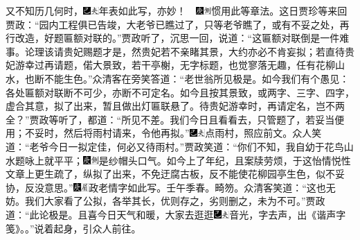 又不知历几何时，{\includegraphics[width=3mm]{../Images/00003}\includegraphics[width=3mm]{../Images/00012}\footnotesize \kaishu 年表如此写，亦妙！　{\includegraphics[width=3mm]{../Images/00004}\includegraphics[width=3mm]{../Images/00011}\footnotesize \kaishu 惯用此等章法。}}这日贾珍等来回贾政：``园内工程俱已告竣，大老爷已瞧过了，只等老爷瞧了，或有不妥之处，再行改造，好题匾额对联的。''贾政听了，沉思一回，说道：``这匾额对联倒是一件难事。论理该请贵妃赐题才是，然贵妃若不亲睹其景，大约亦必不肯妄拟；若直待贵妃游幸过再请题，偌大景致，若干亭榭，无字标题，也觉寥落无趣，任有花柳山水，也断不能生色。''众清客在旁笑答道：``老世翁所见极是。如今我们有个愚见：各处匾额对联断不可少，亦断不可定名。如今且按其景致，或两字、三字、四字，虚合其意，拟了出来，暂且做出灯匾联悬了。待贵妃游幸时，再请定名，岂不两全？''贾政等听了，都道：``所见不差。我们今日且看看去，只管题了，若妥当便用；不妥时，然后将雨村请来，令他再拟。''{\includegraphics[width=3mm]{../Images/00003}\includegraphics[width=3mm]{../Images/00012}\footnotesize \kaishu 点雨村，照应前文。}众人笑道：``老爷今日一拟定佳，何必又待雨村。''贾政笑道：``你们不知，我自幼于花鸟山水题咏上就平平；{\includegraphics[width=3mm]{../Images/00004}\includegraphics[width=3mm]{../Images/00011}\footnotesize \kaishu 是纱帽头口气。}如今上了年纪，且案牍劳烦，于这怡情悦性文章上更生疏了，纵拟了出来，不免迂腐古板，反不能使花柳园亭生色，似不妥协，反没意思。''{\includegraphics[width=3mm]{../Images/00004}\includegraphics[width=3mm]{../Images/00010}\footnotesize \kaishu 政老情字如此写。壬午季春。畸笏。}众清客笑道：``这也无妨。我们大家看了公拟，各举其长，优则存之，劣则删之，未为不可。''贾政道：``此论极是。且喜今日天气和暖，大家去逛逛{\includegraphics[width=3mm]{../Images/00003}\includegraphics[width=3mm]{../Images/00012}\footnotesize \kaishu 音光，字去声，出《谐声字笺》。}。''说着起身，引众人前往。

